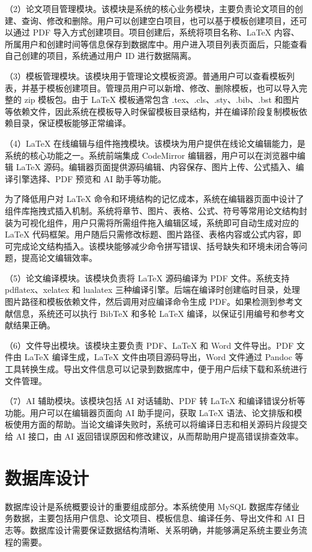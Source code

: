 \documentclass{xduugthesis}
\begin{document}
（2）论文项目管理模块。该模块是系统的核心业务模块，主要负责论文项目的创建、查询、修改和删除。用户可以创建空白项目，也可以基于模板创建项目，还可以通过 PDF 导入方式创建项目。项目创建后，系统将项目名称、LaTeX 内容、所属用户和创建时间等信息保存到数据库中。用户进入项目列表页面后，只能查看自己创建的项目，系统通过用户 ID 进行数据隔离。

（3）模板管理模块。该模块用于管理论文模板资源。普通用户可以查看模板列表，并基于模板创建项目。管理员用户可以新增、修改、删除模板，也可以导入完整的 zip 模板包。由于 LaTeX 模板通常包含 .tex、.cls、.sty、.bib、.bst 和图片等依赖文件，因此系统在模板导入时保留模板目录结构，并在编译阶段复制模板依赖目录，保证模板能够正常编译。

（4）LaTeX 在线编辑与组件拖拽模块。该模块为用户提供在线论文编辑能力，是系统的核心功能之一。系统前端集成 CodeMirror 编辑器，用户可以在浏览器中编辑 LaTeX 源码。编辑器页面提供源码编辑、内容保存、图片上传、公式插入、编译引擎选择、PDF 预览和 AI 助手等功能。

为了降低用户对 LaTeX 命令和环境结构的记忆成本，系统在编辑器页面中设计了组件库拖拽式插入机制。系统将章节、图片、表格、公式、符号等常用论文结构封装为可视化组件，用户只需将所需组件拖入编辑区域，系统即可自动生成对应的 LaTeX 代码框架。用户随后只需修改标题、图片路径、表格内容或公式内容，即可完成论文结构插入。该模块能够减少命令拼写错误、括号缺失和环境未闭合等问题，提高论文编辑效率。

（5）论文编译模块。该模块负责将 LaTeX 源码编译为 PDF 文件。系统支持 pdflatex、xelatex 和 lualatex 三种编译引擎。后端在编译时创建临时目录，处理图片路径和模板依赖文件，然后调用对应编译命令生成 PDF。如果检测到参考文献信息，系统还可以执行 BibTeX 和多轮 LaTeX 编译，以保证引用编号和参考文献结果正确。

（6）文件导出模块。该模块主要负责 PDF、LaTeX 和 Word 文件导出。PDF 文件由 LaTeX 编译生成，LaTeX 文件由项目源码导出，Word 文件通过 Pandoc 等工具转换生成。导出文件信息可以记录到数据库中，便于用户后续下载和系统进行文件管理。

（7）AI 辅助模块。该模块包括 AI 对话辅助、PDF 转 LaTeX 和编译错误分析等功能。用户可以在编辑器页面向 AI 助手提问，获取 LaTeX 语法、论文排版和模板使用方面的帮助。当论文编译失败时，系统可以将编译日志和相关源码片段提交给 AI 接口，由 AI 返回错误原因和修改建议，从而帮助用户提高错误排查效率。

\section{数据库设计}
数据库设计是系统概要设计的重要组成部分。本系统使用 MySQL 数据库存储业务数据，主要包括用户信息、论文项目、模板信息、编译任务、导出文件和 AI 日志等。数据库设计需要保证数据结构清晰、关系明确，并能够满足系统主要业务流程的需要。
\end{document}
